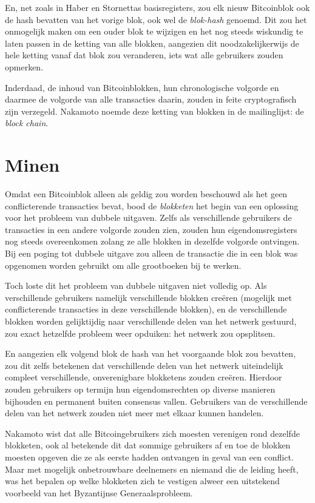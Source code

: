 \documentclass[
  a5paper,
  smalldemyvopaper,11pt,twoside,onecolumn,openright,extrafontsizes,
hidelinks]{memoir}
\begin{document}
En, net zoals in Haber en Stornettas basisregisters, zou elk nieuw
Bitcoinblok ook de hash bevatten van het vorige blok, ook wel de
\emph{blok-hash} genoemd. Dit zou het onmogelijk maken om een ouder blok
te wijzigen en het nog steeds wiskundig te laten passen in de ketting
van alle blokken, aangezien dit noodzakelijkerwijs de hele ketting vanaf
dat blok zou veranderen, iets wat alle gebruikers zouden opmerken.

Inderdaad, de inhoud van Bitcoinblokken, hun chronologische volgorde en
daarmee de volgorde van alle transacties daarin, zouden in feite
cryptografisch zijn verzegeld. Nakamoto noemde deze ketting van blokken
in de mailinglijst: de \emph{block chain}.

\section{Minen}\label{minen}

Omdat een Bitcoinblok alleen als geldig zou worden beschouwd als het
geen conflicterende transacties bevat, bood de \emph{blokketen} het
begin van een oplossing voor het probleem van dubbele uitgaven. Zelfs
als verschillende gebruikers de transacties in een andere volgorde
zouden zien, zouden hun eigendomsregisters nog steeds overeenkomen
zolang ze alle blokken in dezelfde volgorde ontvingen. Bij een poging
tot dubbele uitgave zou alleen de transactie die in een blok was
opgenomen worden gebruikt om alle grootboeken bij te werken.

Toch loste dit het probleem van dubbele uitgaven niet volledig op. Als
verschillende gebruikers namelijk verschillende blokken creëren
(mogelijk met conflicterende transacties in deze verschillende blokken),
en de verschillende blokken worden gelijktijdig naar verschillende delen
van het netwerk gestuurd, zou exact hetzelfde probleem weer opduiken:
het netwerk zou opsplitsen.

En aangezien elk volgend blok de hash van het voorgaande blok zou
bevatten, zou dit zelfs betekenen dat verschillende delen van het
netwerk uiteindelijk compleet verschillende, onverenigbare blokketens
zouden creëren. Hierdoor zouden gebruikers op termijn hun
eigendomsrechten op diverse manieren bijhouden en permanent buiten
consensus vallen. Gebruikers van de verschillende delen van het netwerk
zouden niet meer met elkaar kunnen handelen.

Nakamoto wist dat alle Bitcoingebruikers zich moesten verenigen rond
dezelfde blokketen, ook al betekende dit dat sommige gebruikers af en
toe de blokken moesten opgeven die ze als eerste hadden ontvangen in
geval van een conflict. Maar met mogelijk onbetrouwbare deelnemers en
niemand die de leiding heeft, was het bepalen op welke blokketen zich te
vestigen alweer een uitstekend voorbeeld van het Byzantijnse
Generaalsprobleem.
\end{document}
